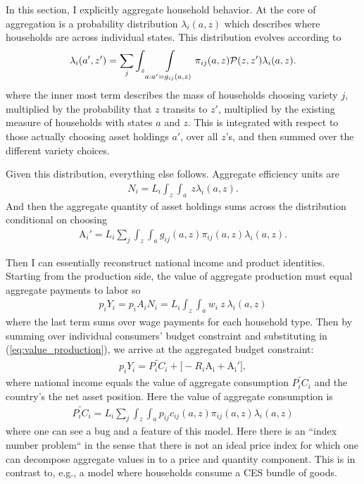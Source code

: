 \documentclass[12pt,pdftex]{article}
\begin{document}
\begin{onehalfspacing}
In this section, I explicitly aggregate household behavior. At the core of aggregation is a probability distribution $\lambda_{i}(a, z)$ which describes where households are across individual states. This distribution evolves according to
\begin{align}
\lambda_i(a', z') = \sum_{j} \int_{z}\int\displaylimits_{a: a' = g_{ij}(a, z)} \pi_{ij}(a, z) \mathcal{P}(z, z') \lambda_i(a, z).
\label{eq:law_motion}
\end{align}
where the inner most term describes the mass of households choosing variety $j$, multiplied by the probability that $z$ transits to $z'$, multiplied by the existing measure of households with states $a$ and $z$. This is integrated with respect to those actually choosing asset holdings $a'$, over all $z$'s, and then summed over the different variety choices. 

Given this distribution, everything else follows. Aggregate efficiency units are
\begin{align}
N_i = L_{i}\int_{z} \int_{a}\ z \lambda_i(a, z). \label{eq:ag-labor-supply}
\end{align}
And then the aggregate quantity of asset holdings sums across the distribution conditional on choosing
\begin{align}
\mathrm{A}_i' = L_{i}\sum_{j} \int_{z} \int_{a}  g_{ij}(a, z) \pi_{ij}(a, z) \lambda_i(a, z).
\label{eq:aggregate_asset}
\end{align}

Then I can essentially reconstruct national income and product identities. Starting from the production side, the value of aggregate production must equal aggregate payments to labor so
\begin{align}
p_{i} Y_{i} = p_{i} A_{i} N_{i} = L_i \int_{z} \int_{a} w_{i} \ z \ \lambda_i(a, z)
\label{eq:value_production}
\end{align}
where the last term sums over wage payments for each household type. Then by summing over individual consumers' budget constraint and substituting in (\ref{eq:value_production}), we arrive at the aggregated budget constraint:
\begin{align}
p_{i} Y_{i}  = \widetilde{P_{i} C_i}  + \bigg[-R_i\mathrm{A_i} +  \mathrm{A_i'} \bigg],
\label{eq:aggregate_budget_constraint}
\end{align}
where national income equals the value of aggregate consumption $\widetilde{P_{i} C_i}$ and the country's the net asset position. Here the value of aggregate consumption is
\begin{align}
\widetilde{P_{i} C_i} = L_{i} \sum_{j} \int_{z} \int_{a}  p_{ij} c_{ij}(a, z) \pi_{ij}(a, z) \lambda_i(a, z)
\end{align}
where one can see a bug and a feature of this model. Here there is an ``index number problem`` in the sense that there is not an ideal price index for which one can decompose aggregate values in to a price and quantity component. This is in contrast to, e.g., a model where households consume a CES bundle of goods.


\end{onehalfspacing}
\end{document}
